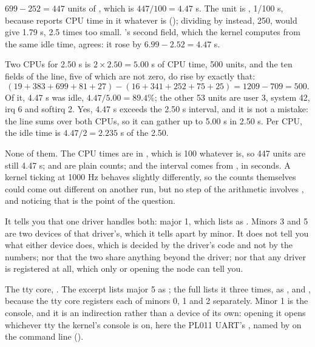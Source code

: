  $699 - 252 = 447$ units of , which is $447 / 100 = 4.47$ s. The unit is
, 1/100 s, because  reports CPU time in it whatever 
is (); dividing by  instead, 250, would give 1.79 s, 2.5 times too small.
's second field, which the kernel computes from the same idle time, agrees: it
rose by $6.99 - 2.52 = 4.47$ s.

 Two CPUs for 2.50 s is $2 \times 2.50 = 5.00$ s of CPU time, 500 units, and the ten fields
of the  line, five of which are not zero, do rise by exactly that:
\[
(19 + 383 + 699 + 81 + 27) - (16 + 341 + 252 + 75 + 25) = 1209 - 709 = 500.
\]
Of it, 4.47 s was idle, $4.47 / 5.00 = 89.4\%$; the other 53 units are user 3, system 42, irq 6 and
softirq 2. Yes, 4.47 s exceeds the 2.50 s interval, and it is not a mistake: the  line
sums over both CPUs, so it can gather up to 5.00 s in 2.50 s. Per CPU, the idle time is
$4.47 / 2 = 2.235$ s of the 2.50.

 None of them. The CPU times are in , which is 100 whatever 
is, so 447 units are still 4.47 s;  and  are plain counts; and the
interval comes from , in seconds. A kernel ticking at 1000 Hz behaves slightly
differently, so the counts themselves could come out different on another run, but no step of the
arithmetic involves , and noticing that is the point of the question.


 It tells you that one driver handles both: major 1, which  lists as
. Minors 3 and 5 are two devices of that driver's, which it tells apart by minor. It does
not tell you what either device does, which is decided by the driver's code and not by the numbers;
nor that the two share anything beyond the driver; nor that any driver is registered at all, which
only  or opening the node can tell you.

 The tty core, . The excerpt lists major 5 as ;
the full  lists it three times, as ,  and
, because the tty core registers each of minors 0, 1 and 2 separately. Minor 1 is
the console, and it is an indirection rather than a device of its own: opening it opens whichever
tty the kernel's console is on, here the PL011 UART's , named by 
on the command line ().

